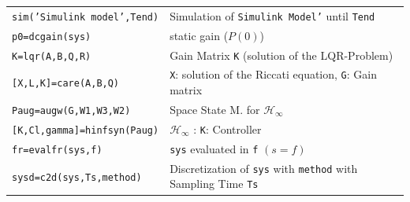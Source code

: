 \documentclass[a4paper,12 pt]{article}
\numberwithin{equation}{section}
\theoremstyle{definition}
\theoremstyle{remark}
\theoremstyle{definition}
\theoremstyle{definition}
\theoremstyle{definition}
\theoremstyle{remark}
\begin{document}
\begin{center}
\begin{tabular}{ll}
\texttt{sim('Simulink model',Tend)} & Simulation of \texttt{Simulink Model'} until \texttt{Tend} \\
\texttt{p0=dcgain(sys)} & static gain ($P(0)$) \\
\texttt{K=lqr(A,B,Q,R)} & Gain Matrix \texttt{K} (solution of the LQR-Problem) \\
\texttt{[X,L,K]=care(A,B,Q)} & \texttt{X}: solution of the Riccati equation, \texttt{G}: Gain matrix \\
\texttt{Paug=augw(G,W1,W3,W2)} & Space State M. for $\mathcal{H}_\infty$ \\
\texttt{[K,Cl,gamma]=hinfsyn(Paug)} & $\mathcal{H}_\infty$ : \texttt{K}: Controller \\
\texttt{fr=evalfr(sys,f)} & \texttt{sys} evaluated in \texttt{f} $(s=f)$ \\
\texttt{sysd=c2d(sys,Ts,method)} & Discretization of \texttt{sys} with \texttt{method} with Sampling Time \texttt{Ts} \\
\bottomrule
\end{tabular}\end{center}

\newpage
\end{document}
